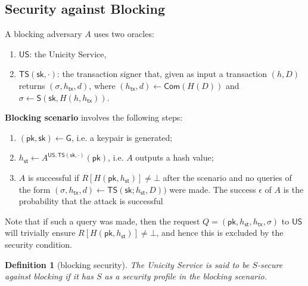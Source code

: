 \documentclass{article}
\newtheorem{definition}{Definition}[section]
\newcommand{\pubkey}[0]{\mathsf{pk}}
\newcommand{\prikey}[0]{\mathsf{sk}}
\newcommand{\commit}[0]{\mathsf{Com}}
\newcommand{\sthash}[0]{h_\mathsf{st}}
\newcommand{\txhash}[0]{h_\mathsf{tx}}
\begin{document}
\subsection{Security against Blocking}

A blocking adversary $A$ uses two oracles:
\begin{enumerate}
\item $\mathsf{US}$: the Unicity Service,
\item $\mathsf{TS}(\prikey,\cdot)$: the transaction signer that, given as input a transaction $(h,D)$ returns $(\sigma, \txhash, d)$, where
$(\txhash, d)\gets \commit(H(D))$ and
$\sigma \gets \mathsf{S}(\prikey,H(h,\txhash))$.
\end{enumerate}

\noindent\textbf{Blocking scenario} involves the following steps:
\begin{enumerate}
\item $(\pubkey,\prikey)\gets \mathsf{G}$, i.e. a keypair is generated;
\item $h_\mathsf{st}\gets A^{\mathsf{US},\mathsf{TS}(\prikey,\cdot)}(\pubkey)$, i.e. $A$ outputs a hash value;
\item $A$ is successful if
$R[H(\pubkey,h_\mathsf{st})]\neq\bot$ after the scenario and no queries of the form $(\sigma,\txhash,d)\gets\mathsf{TS}(\prikey;h_\mathsf{st},D))$ were made.
The success $\epsilon$ of $A$ is the probability that the attack is successful
\end{enumerate}

\noindent Note that if such a query was made, then the request $Q=(\pubkey,\sthash, \txhash,\sigma)$ to $\mathsf{US}$ will trivially ensure $R[H(\pubkey,h_\mathsf{st})]\neq\bot$, and hence this is excluded by the security condition. \medskip

\begin{definition}[blocking security]
The Unicity Service is said to be $S$-secure against blocking if it has $S$ as a security profile in the blocking scenario.
\end{definition}
\end{document}
